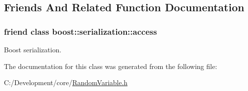 \subsection{Friends And Related Function Documentation}
\hypertarget{class_c_continuous_r_v_ac98d07dd8f7b70e16ccb9a01abf56b9c}{
\subsubsection[{boost\-::serialization\-::access}]{\setlength{\rightskip}{0pt plus 5cm}friend class boost\-::serialization\-::access\hspace{0.3cm}{\ttfamily [friend]}}}\label{class_c_continuous_r_v_ac98d07dd8f7b70e16ccb9a01abf56b9c}


Boost serialization. 



The documentation for this class was generated from the following file\-:\begin{DoxyCompactItemize}
\item 
C\-:/\-Development/core/\hyperlink{_random_variable_8h}{Random\-Variable.\-h}\end{DoxyCompactItemize}
